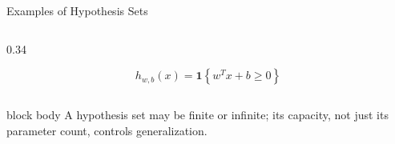 \documentclass[aspectratio=169,10pt]{beamer}
\newcommand{\ind}[1]{\mathbf{1}\!\left\{#1\right\}}
\begin{document}
\begin{frame}[t]{Examples of Hypothesis Sets}
\begin{columns}[T,totalwidth=\textwidth]
\begin{column}{0.34\textwidth}
      \[
        h_{w,b}(x)=\ind{w^Tx+b\ge0}
      \]
    \end{column}
  \end{columns}
  \vspace{0.10cm}
  \begin{beamercolorbox}[rounded=true,sep=0.18cm,wd=0.94\linewidth,center]{block body}
    \centering
    A hypothesis set may be finite or infinite; its capacity, not just its parameter count, controls generalization.
  \end{beamercolorbox}
\end{frame}
\end{document}

